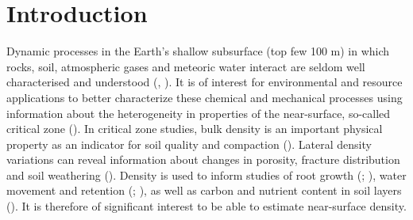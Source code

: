 \documentclass{article} %
\providecommand{\DIFdelbegin}{} %
\providecommand{\DIFdelend}{} %
\newcommand{\DIFscaledelfig}{0.5}
\newlength{\DIFdelgraphicswidth} %
\newlength{\DIFdelgraphicsheight} %
\newcommand{\DIFdelincludegraphics}[2][]{%
\sbox{\DIFdelgraphicsbox}{\DIFOincludegraphics[#1]{#2}}%
\settoboxwidth{\DIFdelgraphicswidth}{\DIFdelgraphicsbox} %
\settoboxtotalheight{\DIFdelgraphicsheight}{\DIFdelgraphicsbox} %
\scalebox{\DIFscaledelfig}{%
\parbox[b]{\DIFdelgraphicswidth}{\usebox{\DIFdelgraphicsbox}\\[-\baselineskip] \rule{\DIFdelgraphicswidth}{0em}}\llap{\resizebox{\DIFdelgraphicswidth}{\DIFdelgraphicsheight}{%
\setlength{\unitlength}{\DIFdelgraphicswidth}%
\begin{picture}(1,1)%
\thicklines\linethickness{2pt} %
{\color[rgb]{1,0,0}\put(0,0){\framebox(1,1){}}}%
{\color[rgb]{1,0,0}\put(0,0){\line( 1,1){1}}}%
{\color[rgb]{1,0,0}\put(0,1){\line(1,-1){1}}}%
\end{picture}%
}\hspace*{3pt}}} %
} %
\DeclareRobustCommand{\DIFdelbegin}{\DIFOdelbegin \let\includegraphics\DIFdelincludegraphics} %
\DeclareRobustCommand{\DIFdelend}{\DIFOaddend \let\includegraphics\DIFOincludegraphics} %
\begin{document}
	
	\newpage
	\section{Introduction}
	\DIFdelbegin %



\DIFdelend Dynamic processes in the Earth's shallow subsurface (top few 100 m) in which rocks, soil, atmospheric gases and meteoric water interact are seldom well characterised and understood (\cite{parsekian2015multiscale}, \cite{riebe2017controls}). It is of interest for environmental and resource applications to better characterize these chemical and mechanical processes using information about the heterogeneity in properties of the near-surface, so-called critical zone (\cite{anderson2007physical}). In critical zone studies, bulk density is an important physical property as an indicator for soil quality and compaction (\cite{suuster2011soil}). Lateral density variations can reveal information about changes in porosity, fracture distribution and soil weathering (\cite{flinchum2022p}). Density is used to inform studies of root growth (\cite{brimhall1992deformational}; \cite{dexter2004soil}), water movement and retention (\cite{huang2011soil}; \cite{flinchum2018estimating}), as well as carbon and nutrient content in soil layers (\cite{nanko2014pedotransfer}). It is therefore of significant interest to be able to estimate near-surface density.\\
\end{document}
